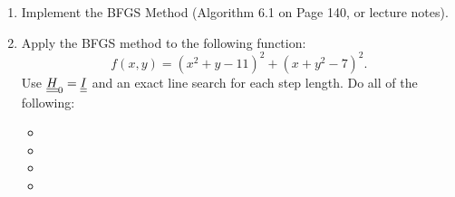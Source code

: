 \documentclass[11pt, oneside]{article}
\begin{document}
\begin{enumerate}
\begin{proof}
      Thus $A^{1/2}$ satisfies all the criterion for the square root of the
      matrix $A$.
    \end{proof}

  \item %
    Implement the BFGS Method (Algorithm 6.1 on Page 140, or lecture notes).

  \item %
    Apply the BFGS method to the following function:
    \[
      f(x, y) = (x^2 + y - 11)^2 + (x + y^2 - 7)^2.
    \]
    Use $\underline{\underline{H}}_0 = \underline{\underline{I}}$ and an exact line search for each step length.
    Do all of the following:
    \begin{itemize}
      \item
      \item
      \item
      \item
    \end{itemize}
\end{enumerate}
\end{document}
